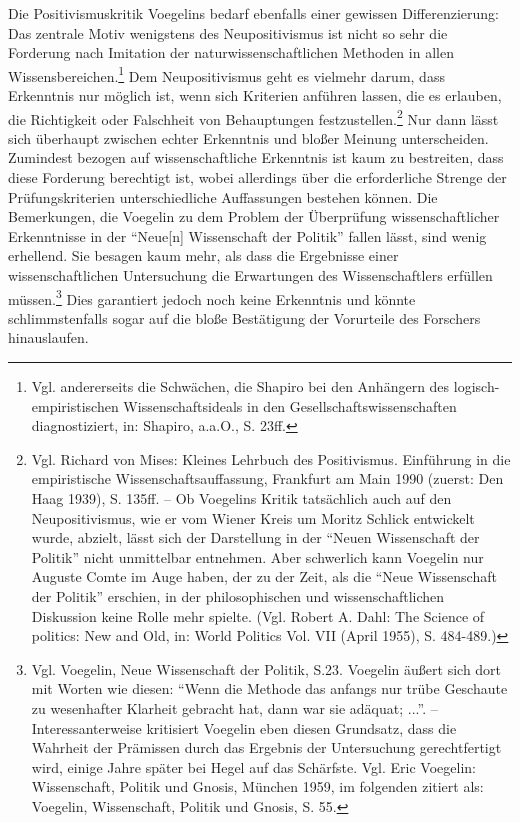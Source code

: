 Die Positivismuskritik Voegelins bedarf ebenfalls einer gewissen
Differenzierung: Das zentrale Motiv wenigstens des Neupositivismus ist nicht
so sehr die Forderung nach Imitation der naturwissenschaftlichen Methoden in
allen Wissensbereichen.\footnote{Vgl. andererseits die Schwächen, die Shapiro
  bei den Anhängern des logisch-empiristischen Wissenschaftsideals in den
  Gesellschaftswissenschaften diagnostiziert, in: Shapiro, a.a.O., S. 23ff.}
Dem Neupositivismus geht es vielmehr darum, dass Erkenntnis nur möglich ist,
wenn sich Kriterien anführen lassen, die es erlauben, die Richtigkeit oder
Falschheit von Behauptungen festzustellen.\footnote{Vgl. Richard von Mises:
  Kleines Lehrbuch des Positivismus. Einführung in die empiristische
  Wissenschaftsauf\/fassung, Frankfurt am Main 1990 (zuerst: Den Haag 1939),
  S. 135ff. -- Ob Voegelins Kritik tatsächlich auch auf den Neupositivismus,
  wie er vom Wiener Kreis um Moritz Schlick entwickelt wurde, abzielt, lässt
  sich der Darstellung in der "`Neuen Wissenschaft der Politik"' nicht
  unmittelbar entnehmen. Aber schwerlich kann Voegelin nur Auguste Comte im
  Auge haben, der zu der Zeit, als die "`Neue Wissenschaft der Politik"'
  erschien, in der philosophischen und wissenschaftlichen Diskussion keine
  Rolle mehr spielte.  (Vgl. Robert A.  Dahl: The Science of politics: New and
  Old, in: World Politics Vol. VII (April 1955), S. 484-489.)} Nur dann lässt
sich überhaupt zwischen echter Erkenntnis und bloßer Meinung unterscheiden.
Zumindest bezogen auf wissenschaftliche Erkenntnis ist kaum zu bestreiten,
dass diese Forderung berechtigt ist, wobei allerdings über die erforderliche
Strenge der Prüfungskriterien unterschiedliche Auf\/fassungen bestehen können.
Die Bemerkungen, die Voegelin zu dem Problem der Überprüfung
wissenschaftlicher Erkenntnisse in der "`Neue[n] Wissenschaft der Politik"'
fallen lässt, sind wenig erhellend. Sie besagen kaum mehr, als dass die
Ergebnisse einer wissenschaftlichen Untersuchung die Erwartungen des
Wissenschaftlers erfüllen müssen.\footnote{Vgl. Voegelin, Neue Wissenschaft
  der Politik, S.23. Voegelin äußert sich dort mit Worten wie diesen: "`Wenn
  die Methode das anfangs nur trübe Geschaute zu wesenhafter Klarheit gebracht
  hat, dann war sie adäquat; ..."'. -- Interessanterweise kritisiert Voegelin
  eben diesen Grundsatz, dass die Wahrheit der Prämissen durch das Ergebnis
  der Untersuchung gerechtfertigt wird, einige Jahre später bei Hegel auf das
  Schärfste. Vgl.  Eric Voegelin: Wissenschaft, Politik und Gnosis, München
  1959, im folgenden zitiert als: Voegelin, Wissenschaft, Politik und Gnosis,
  S. 55.} Dies garantiert jedoch noch keine Erkenntnis und könnte
schlimmstenfalls sogar auf die bloße Bestätigung der Vorurteile des Forschers
hinauslaufen.

